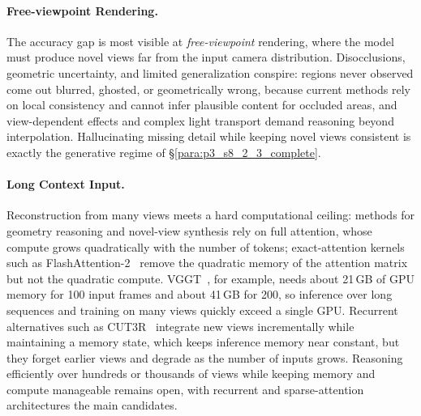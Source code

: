 \paragraph{Free-viewpoint Rendering.}
The accuracy gap is most visible at \emph{free-viewpoint} rendering, where the model must produce novel views far from the input camera distribution.
Disocclusions, geometric uncertainty, and limited generalization conspire: regions never observed come out blurred, ghosted, or geometrically wrong, because current methods rely on local consistency and cannot infer plausible content for occluded areas, and view-dependent effects and complex light transport demand reasoning beyond interpolation.
Hallucinating missing detail while keeping novel views consistent is exactly the generative regime of §\ref{para:p3_s8_2_3_complete}.

\paragraph{Long Context Input.}
Reconstruction from many views meets a hard computational ceiling: methods for geometry reasoning and novel-view synthesis rely on full attention, whose compute grows quadratically with the number of tokens; exact-attention kernels such as FlashAttention-2~\cite{dao2023flashattention2} remove the quadratic memory of the attention matrix but not the quadratic compute.
VGGT~\cite{wang2025vggt}, for example, needs about 21\,GB of GPU memory for 100 input frames and about 41\,GB for 200, so inference over long sequences and training on many views quickly exceed a single GPU.
Recurrent alternatives such as CUT3R~\cite{wang2025Cut3R} integrate new views incrementally while maintaining a memory state, which keeps inference memory near constant, but they forget earlier views and degrade as the number of inputs grows.
Reasoning efficiently over hundreds or thousands of views while keeping memory and compute manageable remains open, with recurrent and sparse-attention architectures the main candidates.
